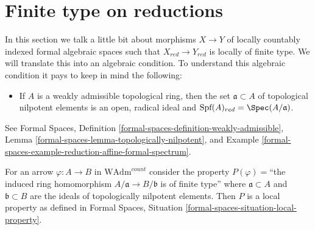 \section{Finite type on reductions}
\label{section-finite-type-red}

\noindent
In this section we talk a little bit about morphisms $X \to Y$
of locally countably indexed formal algebraic spaces such that
$X_{red} \to Y_{red}$ is locally of finite type. We will translate
this into an algebraic condition. To understand this algebraic
condition it pays to keep in mind the following:
\begin{itemize}
\item If $A$ is a weakly admissible topological ring, then the
set $\mathfrak a \subset A$ of topological nilpotent elements
is an open, radical ideal and
$\text{Spf}(A)_{red} = \Spec(A/\mathfrak a)$.
\end{itemize}
See Formal Spaces, Definition
\ref{formal-spaces-definition-weakly-admissible},
Lemma \ref{formal-spaces-lemma-topologically-nilpotent}, and
Example \ref{formal-spaces-example-reduction-affine-formal-spectrum}.

\begin{lemma}
\label{lemma-finite-type-red}
For an arrow $\varphi : A \to B$ in $\text{WAdm}^{count}$ consider
the property $P(\varphi)=$``the induced ring homomorphism
$A/\mathfrak a \to B/\mathfrak b$ is of finite type''
where $\mathfrak a \subset A$ and $\mathfrak b \subset B$ are the ideals
of topologically nilpotent elements. Then $P$ is a local property
as defined in
Formal Spaces, Situation
\ref{formal-spaces-situation-local-property}.
\end{lemma}

